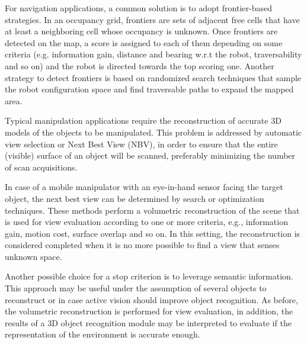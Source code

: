 \documentclass[letterpaper, 10 pt, conference]{ieeeconf}  %
\begin{document}

For navigation applications, a common solution is to adopt frontier-based strategies. In an occupancy grid, frontiers are sets of adjacent free cells that have at least a neighboring cell whose occupancy is unknown. Once frontiers are detected on the map, a score is assigned to each of them depending on some criteria (e.g. information gain, distance and bearing w.r.t the robot, traversability and so on) and the robot is directed towards the top scoring one. Another strategy to detect frontiers is based on randomized search techniques that sample the robot configuration space and find traversable paths to expand the mapped area. 

Typical manipulation applications require the reconstruction of accurate 3D models of the objects to be manipulated. This problem is addressed by automatic view selection or Next Best View (NBV), in order to ensure that the entire (visible) surface of an object will be scanned, preferably minimizing the number of scan acquisitions. 

In case of a mobile manipulator with an eye-in-hand sensor facing the target object, the next best view can be determined by search or optimization techniques. These methods perform a volumetric reconstruction of the scene that is used for view evaluation according to one or more criteria, e.g., information gain, motion cost, surface overlap and so on. In this setting, the reconstruction is considered completed when it is no more possible to find a view that senses unknown space. 

Another possible choice for a stop criterion is to leverage semantic information. This approach may be useful under the assumption of several objects to reconstruct or in case active vision should improve object recognition. As before, the volumetric reconstruction is performed for view evaluation, in addition, the results of a 3D object recognition module may be interpreted to evaluate if the representation of the environment is accurate enough.
\end{document}
